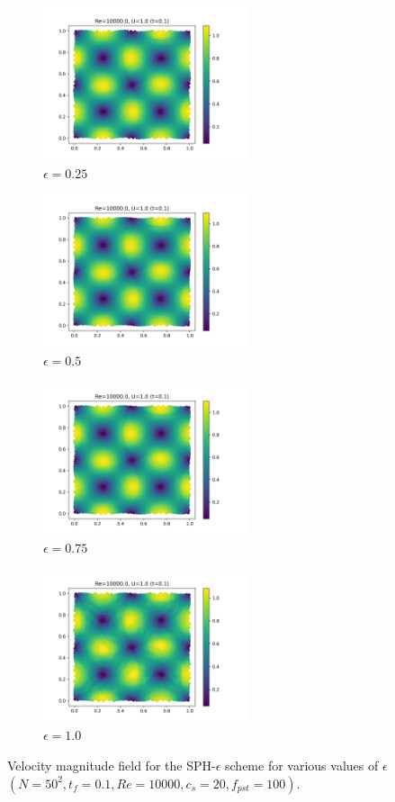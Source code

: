 \begin{figure}[htbp!]
  \begin{subfigure}{7cm}
  \centering\includegraphics[width=6cm]{Code-Figures/mon2017/meps/c0_20_tait_pec_dtmul_1_meps_0.25_nx_50_pst_10_re_10000_mon2017/final_vmag.png}
  \caption{$\epsilon = 0.25$}
  \end{subfigure}
  \begin{subfigure}{7cm}
  \centering\includegraphics[width=6cm]{Code-Figures/mon2017/meps/c0_20_tait_pec_dtmul_1_meps_0.5_nx_50_pst_10_re_10000_mon2017/final_vmag.png}
  \caption{$\epsilon = 0.5$}
  \end{subfigure}
  \begin{subfigure}{7cm}
  \centering\includegraphics[width=6cm]{Code-Figures/mon2017/meps/c0_20_tait_pec_dtmul_1_meps_0.75_nx_50_pst_10_re_10000_mon2017/final_vmag.png}
  \caption{$\epsilon = 0.75$}
  \end{subfigure}
  \begin{subfigure}{7cm}
  \centering\includegraphics[width=6cm]{Code-Figures/mon2017/meps/c0_20_tait_pec_dtmul_1_meps_1.0_nx_50_pst_10_re_10000_mon2017/final_vmag.png}
  \caption{$\epsilon = 1.0$}
  \end{subfigure}
  \caption{Velocity magnitude field for the SPH-$\epsilon$ scheme for various values of $\epsilon$ $(N=50^2, t_f=0.1, Re=10000, c_s=20, f_{pst}=100)$.}
  \label{fig:sph-eps-meps-vmag}
\end{figure}

